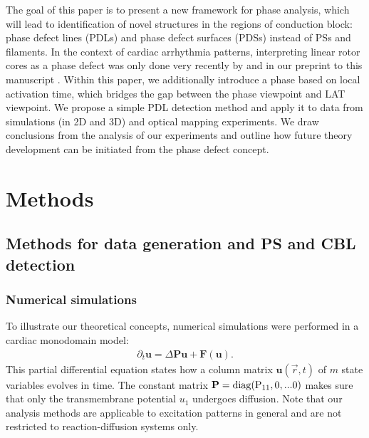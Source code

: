 \documentclass[aps,pre,amsfonts,amssymb,amsmath,twocolumn, superscriptaddress]{revtex4-1}
\newcommand{\uu}{\mathbf{u}}
\newcommand{\dd}{\partial}
\begin{document}
The goal of this paper is to present a new framework for phase analysis, which will lead to identification of novel structures in the regions of conduction block: phase defect lines (PDLs) and phase defect surfaces (PDSs) instead of PSs and filaments.
In the context of cardiac arrhythmia patterns, interpreting linear rotor cores as a phase defect was only done very recently by \cite{Tomii:2021} and in our preprint to this manuscript \citep{Arno:2021arxiv}. Within this paper, we additionally introduce a phase based on local activation time, which bridges the gap between the phase viewpoint and LAT viewpoint. We propose a simple PDL detection method and apply it to data from simulations (in 2D and 3D) and optical mapping experiments. We draw conclusions from the analysis of our experiments and outline how future theory development can be initiated from the phase defect concept. 


\section{Methods} \label{sec:methods}

\subsection{Methods for data generation and PS and CBL detection}

\subsubsection{Numerical simulations}

To illustrate our theoretical concepts, numerical simulations were performed in a cardiac monodomain model:
\begin{align}
    \dd_t \uu =  \Delta \mathbf{P} \uu +  \mathbf{F}(\uu). \label{RDE}
\end{align}
This partial differential equation states how a column matrix $\uu(\vec{r},t)$ of $m$ state variables evolves in time. The constant matrix $\mathbf{P} = \rm{diag}(P_{11},0,...0)$ makes sure that only the transmembrane potential $u_1$ undergoes diffusion. 
Note that our analysis methods are applicable to excitation patterns in general and are not restricted to reaction-diffusion systems only. 
\end{document}
